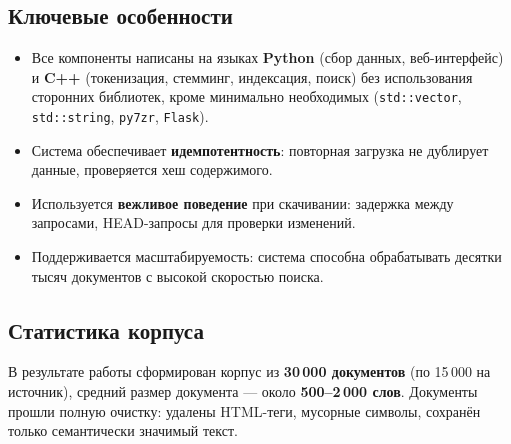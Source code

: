 \subsection*{Ключевые особенности}
\begin{itemize}
    \item Все компоненты написаны на языках \textbf{Python} (сбор данных, веб-интерфейс) и \textbf{C++} (токенизация, стемминг, индексация, поиск) без использования сторонних библиотек, кроме минимально необходимых (\texttt{std::vector}, \texttt{std::string}, \texttt{py7zr}, \texttt{Flask}).
    \item Система обеспечивает \textbf{идемпотентность}: повторная загрузка не дублирует данные, проверяется хеш содержимого.
    \item Используется \textbf{вежливое поведение} при скачивании: задержка между запросами, HEAD-запросы для проверки изменений.
    \item Поддерживается масштабируемость: система способна обрабатывать десятки тысяч документов с высокой скоростью поиска.
\end{itemize}

\subsection*{Статистика корпуса}
В результате работы сформирован корпус из \textbf{30\,000 документов} (по 15\,000 на источник), средний размер документа — около \textbf{500–2\,000 слов}. Документы прошли полную очистку: удалены HTML-теги, мусорные символы, сохранён только семантически значимый текст.

\pagebreak
